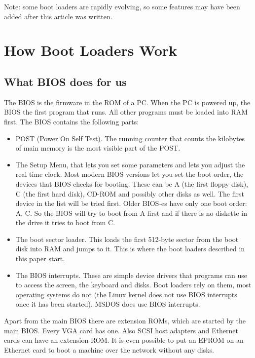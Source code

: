 \documentclass[12pt,a4paper]{article}
\begin{document}
Note: some boot loaders are rapidly evolving, so some features may
have been added after this article was written.

\section{How Boot Loaders Work}

\subsection{What BIOS does for us}

The BIOS is the firmware in the ROM of a PC. When the PC is powered
up, the BIOS the first program that runs. All other programs must be
loaded into RAM first. The BIOS contains the following parts:
\begin{itemize}
\item POST (Power On Self Test). The running counter that counts the
  kilobytes of main memory is the most visible part of the POST.
\item The Setup Menu, that lets you set some parameters and lets you
  adjust the real time clock. Most modern BIOS versions let you set
  the boot order, the devices that BIOS checks for booting. These can
  be A (the first floppy disk), C (the first hard disk), CD-ROM and
  possibly other disks as well. The first device in the list will be
  tried first. Older BIOS-es have only one boot order: A, C. So the
  BIOS will try to boot from A first and if there is no diskette in
  the drive it tries to boot from C.
\item The boot sector loader. This loads the first 512-byte sector
  from the boot disk into RAM and jumps to it. This is where the boot
  loaders described in this paper start.
\item The BIOS interrupts. These are simple device drivers that
  programs can use to access the screen, the keyboard and disks. Boot
  loaders rely on them, most operating systems do not (the Linux
  kernel does not use BIOS interrupts once it has been started). MSDOS
  does use BIOS interrupts. 
\end{itemize}

Apart from the main BIOS there are extension ROMs, which are started
by the main BIOS. Every VGA card has one. Also SCSI host
adapters and Ethernet cards can have an extension ROM. It is even
possible to put an EPROM on an Ethernet card to boot a machine over
the network without any disks.
\end{document}
